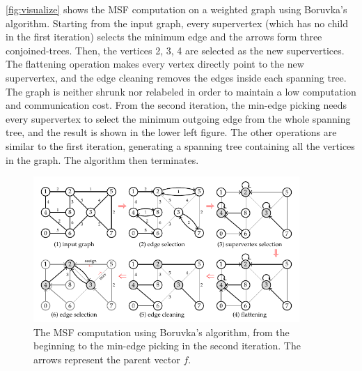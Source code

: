 \documentclass{sokendai_thesis} %
\newcommand{\boruvka}[0]{Boruvka}
\begin{document}
\autoref{fig:visualize} shows the MSF computation on a weighted graph using \boruvka{}'s algorithm.
Starting from the input graph, every supervertex (which has no child in the first iteration) selects the minimum edge and the arrows form three conjoined-trees.
Then, the vertices 2, 3, 4 are selected as the new supervertices.
The flattening operation makes every vertex directly point to the new supervertex, and the edge cleaning removes the edges inside each spanning tree.
The graph is neither shrunk nor relabeled in order to maintain a low computation and communication cost.
From the second iteration, the min-edge picking needs every supervertex to select the minimum outgoing edge from the whole spanning tree, and the result is shown in the lower left figure.
The other operations are similar to the first iteration, generating a spanning tree containing all the vertices in the graph.
The algorithm then terminates.

\begin{figure}
\includegraphics[width=0.9\textwidth]{figures/algo.pdf}
\caption{The MSF computation using \boruvka{}'s algorithm, from the beginning to the min-edge picking in the second iteration. The arrows represent the parent vector $f$.}
\vspace{-8pt}
\label{fig:visualize}
\end{figure}
\end{document}
